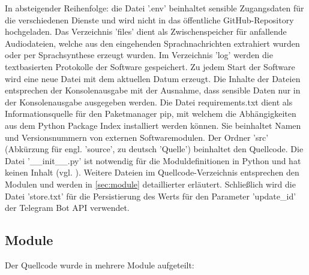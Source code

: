 In absteigender Reihenfolge: die Datei '.env' beinhaltet sensible Zugangsdaten für die verschiedenen Dienste und wird nicht in das öffentliche GitHub-Repository hochgeladen. Das Verzeichnis 'files' dient als Zwischenspeicher für anfallende Audiodateien, welche aus den eingehenden Sprachnachrichten extrahiert wurden oder per Sprachsynthese erzeugt wurden. Im Verzeichnis 'log' werden die textbasierten Protokolle der Software gespeichert. Zu jedem Start der Software wird eine neue Datei mit dem aktuellen Datum erzeugt. Die Inhalte der Dateien entsprechen der Konsolenausgabe mit der Ausnahme, dass sensible Daten nur in der Konsolenausgabe ausgegeben werden. Die Datei requirements.txt dient als Informationsquelle für den Paketmanager pip, mit welchem die Abhängigkeiten aus dem Python Package Index installiert werden können. Sie beinhaltet Namen und Versionsnummern von externen Softwaremodulen. Der Ordner 'src' (Abkürzung für engl. 'source', zu deutsch 'Quelle') beinhaltet den Quellcode. Die Datei '\_\_init\_\_.py' ist notwendig für die Moduldefinitionen in Python und hat keinen Inhalt (vgl. \cite[S. 337]{python}). Weitere Dateien im Quellcode-Verzeichnis entsprechen den Modulen und werden in \autoref{sec:module} detaillierter erläutert. Schließlich wird die Datei 'store.txt' für die Persistierung des Werts für den Parameter 'update\_id' der Telegram Bot API verwendet.

\subsection{Module}
\label{sec:module}

Der Quellcode wurde in mehrere Module aufgeteilt:

